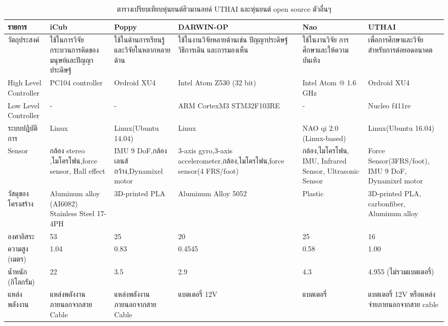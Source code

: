 
\begin{landscape}
    \begin{table}[!ht]
        \begin{tabular}{| p{3.5cm} | p{3.5cm} | p{3.5cm} | p{3.5cm} | p{3.5cm} | p{3.5cm}|}    
        \hline
        รายการ & iCub & Poppy & DARWIN-OP & Nao & UTHAI \\
        \hline
        วัตถุประสงค์ & ใช้ในการวิจัยกระบวนการคิดของมนุษย์และปัญญาประดิษฐ์ & ใช้ในด้านการเรียนรู้และวิจัยในหลากหลายด้าน & 
        ใช้ในงานวิจัยหลายด้านเช่น ปัญญาประดิษฐ์ วิธีการเดิน และการมองเห็น & ใช้ในงานวิจัย การศึกษาและให้ความบันเทิง & 
        เพื่อการศึกษาและวิจัยสำหรับการต่อยอดอนาคต \\
        \hline
        High Level Controller & PC104 controller & Ordroid XU4 & Intel Atom Z530 (32 bit) & 
        Intel Atom @ 1.6 GHz & Ordroid XU4 \\
        \hline
        Low Level Controller & - & - & ARM CortexM3 STM32F103RE & - & Nucleo f411re\\
        \hline
        ระบบปฎิบัติการ & Linux & Linux(Ubuntu 14.04) & Linux & NAO qi 2.0 (Linux-based) & Linux(Ubuntu 16.04) \\
        \hline
        Sensor & กล้อง stereo ,ไมโครโฟน,force sensor, Hall effect & IMU 9 DoF,กล้องเลนส์กว้าง,Dynamixel motor & 
        3-axis gyro,3-axis accelerometer,กล้อง,ไมโครโฟน,force sensor(4 FRS/foot) & 
        กล้อง,ไมโครโฟน, IMU, Infrared Sensor, Ultrasonic Sensor & Force Sensor(3FRS/foot), IMU 9 DoF, Dynamixel motor\\
        \hline
        วัสดุของโครงสร้าง & Aluminum alloy (AI6082) Stainless Steel 17-4PH & 3D-printed PLA & Aluminum Alloy 5052 & 
        Plastic & 3D-printed PLA, carbonfiber, Aluminum alloy\\
        \hline
        องศาอิสระ & 53 & 25 & 20 & 25 & 16 \\
        \hline
        ความสูง (เมตร) & 1.04 & 0.83 & 0.4545 & 0.58 & 1.00 \\
        \hline
        น้ำหนัก (กิโลกรัม) & 22	& 3.5 & 2.9 & 4.3 & 4.955 (ไม่รวมแบตเตอรี่)\\
        \hline
        แหล่งพลังงาน & แหล่งพลังงานภายนอกจากสาย Cable & แหล่งพลังงานภายนอกจากสาย Cable & แบตเตอรี่ 12V & แบตเตอรี่ & 
        แบตเตอรี่ 12V หรือแหล่งจ่ายภายนอกจากสาย cable\\
        \hline
        \end{tabular}
	\caption{ตารางเปรียบเทียบหุ่นยนต์ฮิวมานอยด์ UTHAI และหุ่นยนต์ open source ตัวอื่นๆ}
    \label{tab:humanoid_comp}
    \end{table}
\end{landscape}
